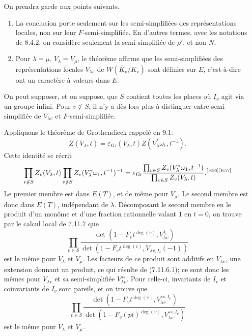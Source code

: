 \documentclass[10pt,letterpaper]{article}
\newcommand{\auditmark}[1]{\textsuperscript{\normalfont\scriptsize[E#1]}}
\begin{document}
On prendra garde aux points suivants.
\begin{enumerate}[label=(\alph*)]
\item La conclusion porte seulement sur les semi-simplifiées des représentations locales, non sur leur $F$-semi-simplifiée. En d'autres termes, avec les notations de 8.4.2, on considère seulement la semi-simplifiée de $\rho'$, et non $N$.
\item Pour $\lambda=\mu$, $V_\lambda=V_\mu$, le théorème affirme que les semi-simplifiées des représentations locales $V_{\lambda v}$ de $W(\overline K_v/K_v)$ sont définies sur $E$, c'est-à-dire ont un caractère à valeurs dans $E$.
\end{enumerate}
On peut supposer, et on suppose, que $S$ contient toutes les places où $I_v$ agit via un groupe infini. Pour $v\notin S$, il n'y a dès lors plus à distinguer entre semi-simplifiée de $V_{\lambda v}$ et $F$-semi-simplifiée.

Appliquons le théorème de Grothendieck rappelé en 9.1:
\[
Z(V_\lambda,t)=\varepsilon_{\mathrm{Gr}}(V_\lambda,t)Z(V_\lambda^*\omega_1,t^{-1}).
\]
Cette identité se récrit
\[
\prod_{v\notin S}Z_v(V_\lambda,t)\prod_{v\notin S}Z_v(V_\lambda^*\omega_1,t^{-1})^{-1}
=
\varepsilon_{\mathrm{Gr}}
\frac{\prod_{v\in S}Z_v(V_\lambda^*\omega_1,t^{-1})}
{\prod_{v\in S}Z_v(V_\lambda,t)}.\auditmark{56}\auditmark{57}
\]
Le premier membre est dans $E(T)$, et de même pour $V_\mu$. Le second membre est donc dans $E(T)$, indépendant de $\lambda$. Décomposant le second membre en le produit d'un monôme et d'une fraction rationnelle valant $1$ en $t=0$, on trouve par le calcul local de 7.11.7 que
\[
\prod_{v\in S}
\frac{\det(1-F_vt^{\deg(v)},V_{\lambda v}^{I_v})}
{\det(1-F_vt^{\deg(v)},V_{\lambda v,I_v}(-1))}
\]
est le même pour $V_\lambda$ et $V_\mu$. Les facteurs de ce produit sont additifs en $V_{\lambda v}$, une extension donnant un produit, ce qui résulte de (7.11.6.1); ce sont donc les mêmes pour $V_{\lambda v}$ et sa semi-simplifiée $V_{\lambda v}^{ss}$. Pour celle-ci, invariants de $I_v$ et coinvariants de $I_v$ sont pareils, et on trouve que
\[
\tag{9.8.1}
\prod_{v\in S}
\frac{\det(1-F_vt^{\deg(v)},V_{\lambda v}^{ss,I_v})}
{\det(1-F_v(pt)^{\deg(v)},V_{\lambda v}^{ss,I_v})}
\]
est le même pour $V_\lambda$ et $V_\mu$.
\end{document}
